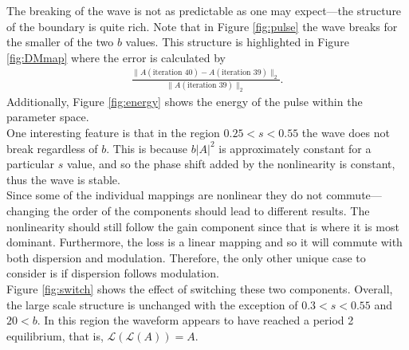 The breaking of the wave is not as predictable as one may expect---the structure of the boundary is quite rich. Note that in Figure \ref{fig:pulse} the wave breaks for the smaller of the two $b$ values. This structure is highlighted in Figure \ref{fig:DMmap} where the error is calculated by
\begin{align*}
\frac{\|A(\text{iteration } 40) - A(\text{iteration } 39) \|_2}{\|A(\text{iteration } 39) \|_2}.
\end{align*}
Additionally, Figure \ref{fig:energy} shows the energy of the pulse within the parameter space. \\

One interesting feature is that in the region $0.25 < s < 0.55$ the wave does not break regardless of $b$. This is because $b|A|^2$ is approximately constant for a particular $s$ value, and so the phase shift added by the nonlinearity is constant, thus the wave is stable. \\

Since some of the individual mappings are nonlinear they do not commute---changing the order of the components should lead to different results. The nonlinearity should still follow the gain component since that is where it is most dominant. Furthermore, the loss is a linear mapping and so it will commute with both dispersion and modulation. Therefore, the only other unique case to consider is if dispersion follows modulation. \\

Figure \ref{fig:switch} shows the effect of switching these two components. Overall, the large scale structure is unchanged with the exception of $0.3 < s < 0.55$ and $20 < b$. In this region the waveform appears to have reached a period 2 equilibrium, that is, $\mathcal{L}(\mathcal{L}(A)) = A$.